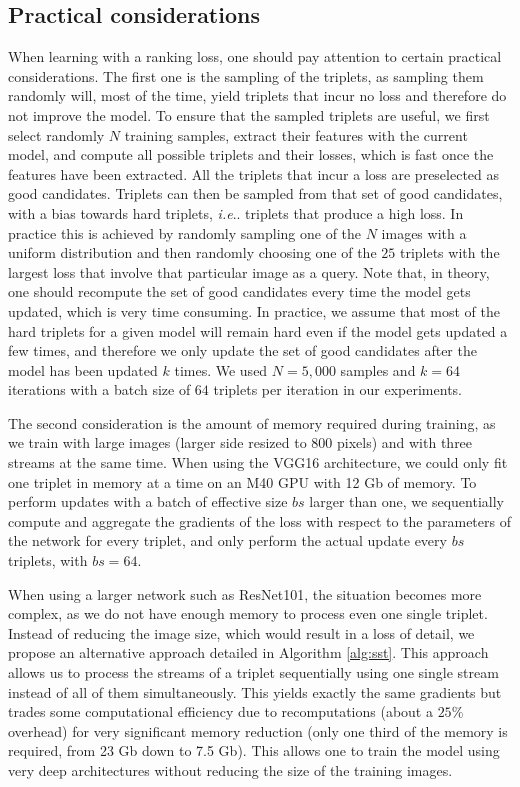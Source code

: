\documentclass[twocolumn]{svjour3}          \smartqed  \usepackage{graphicx}
\makeatletter
\DeclareRobustCommand\onedot{\futurelet\@let@token\@onedot}
\def\@onedot{\ifx\@let@token.\else.\null\fi\xspace}
\def\ie{\emph{i.e}\onedot} \def\Ie{\emph{I.e}\onedot}
\makeatother
\begin{document}
\subsection{Practical considerations}
\label{sec:deeper}
When learning with a ranking loss, one should pay attention to certain practical considerations.
The first one is the sampling of the triplets, as sampling them randomly will, most of the time, yield triplets that incur no loss and therefore do not improve the model.
To ensure that the sampled triplets are useful, we first select randomly $N$ training samples, extract their features with the current model, and compute all possible triplets and their losses, which is fast once the features have been extracted. All the triplets that incur a loss are preselected as good candidates. Triplets can then be sampled from that set of good candidates, with a bias towards hard triplets, \ie triplets that produce a high loss.
In practice this is achieved by randomly sampling one of the $N$ images with a uniform distribution and then randomly choosing one of the $25$ triplets with the largest loss that involve that particular image as a query. 
Note that, in theory, one should recompute the set of good candidates every time the model gets updated, which is very time consuming. In practice, we assume that most of the hard triplets for a given model will remain hard even if the model gets updated a few times, and therefore we only update the set of good candidates after the model has been updated $k$ times. We used  $N = 5,000$ samples and $k=64$ iterations with a batch size of $64$ triplets per iteration in our experiments.

The second consideration is the amount of memory required during training, as we train with large images (larger side resized to 800 pixels) and with three streams at the same time. When using the VGG16 architecture, we could only fit one triplet in memory at a time on an M40 GPU with 12 Gb of memory. To perform updates with a batch of effective size $bs$ larger than one, we sequentially compute and aggregate the gradients of the loss with respect to the parameters of the network for every triplet, and only perform the actual update every $bs$ triplets, with $bs=64$.

When using a larger network such as ResNet101, the situation becomes more complex, as we do not have enough memory to process even one single triplet. Instead of reducing the image size, which would result in a loss of detail, we propose an alternative approach detailed in Algorithm \ref{alg:sst}. This approach allows us to process the streams of a triplet sequentially using one single stream instead of all of them simultaneously. This yields exactly the same gradients but trades some computational efficiency due to recomputations (about a $25\%$ overhead) for very significant memory reduction (only one third of the memory is required, from 23 Gb down to 7.5 Gb). This allows one to train the model using very deep architectures without reducing the size of the training images.
\end{document}
